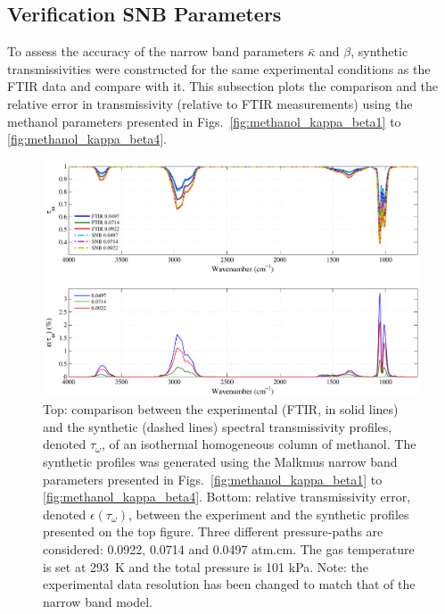\subsection{Verification SNB Parameters}

To assess the accuracy of the narrow band parameters $\bar{\kappa}$ and $\beta$, synthetic transmissivities were constructed for the same experimental conditions as the FTIR data and compare with it. This subsection plots the comparison and the relative error in transmissivity (relative to FTIR measurements) using the methanol parameters presented in Figs.~\ref{fig:methanol_kappa_beta1} to \ref{fig:methanol_kappa_beta4}.

\begin{figure}[!h]
\includegraphics[width=\textwidth]{Figures/Comparison_Fit_Methanol_MALKMUS_Temp293K.pdf}
\caption{Top: comparison between the experimental (FTIR, in solid lines) and the synthetic (dashed lines) spectral transmissivity profiles, denoted $\tau_{\omega}$, of an isothermal homogeneous column of methanol. The synthetic profiles was generated using the Malkmus narrow band parameters presented in Figs.~\ref{fig:methanol_kappa_beta1} to \ref{fig:methanol_kappa_beta4}. Bottom: relative transmissivity error, denoted $\epsilon{(\tau_{\omega})}$, between the experiment and the synthetic profiles presented on the top figure. Three different pressure-paths are considered: 0.0922, 0.0714 and 0.0497 atm.cm. The gas temperature is set at 293~K and the total pressure is 101 kPa. Note: the experimental data resolution has been changed to match that of the narrow band model. \label{fig:methanol_SNBVerify_293K}}
\end{figure}


